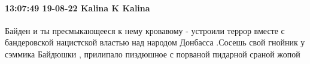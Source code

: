  
 
 
 
 

\paragraph{13:07:49 19-08-22 Kalina K Kalina}

Байден и ты пресмыкающееся к нему кровавому - устроили террор вместе с
бандеровской нацистской властью над народом Донбасса .Сосешь свой гнойник у
сэммика Байдюшки , прилипало пиздюшное с порваной пидарной сраной жопой
